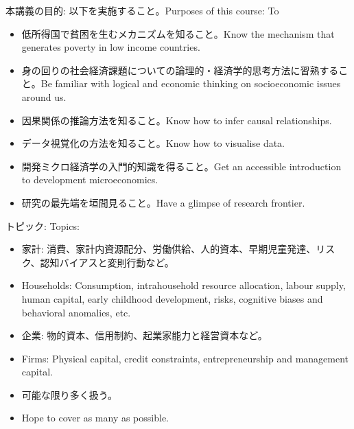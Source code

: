 \begin{frame}{}
本講義の目的: 以下を実施すること。Purposes of this course: To
\begin{itemize}[<+->]
\vspace{1.0ex}\setlength{\itemsep}{3.0ex}\setlength{\baselineskip}{12pt}
\item	低所得国で貧困を生むメカニズムを知ること。Know the mechanism that generates poverty in low income countries.
\item	身の回りの社会経済課題についての論理的・経済学的思考方法に習熟すること。Be familiar with logical and economic thinking on socioeconomic issues around us.
\item	因果関係の推論方法を知ること。Know how to infer causal relationships.
\item	データ視覚化の方法を知ること。Know how to visualise data.
\item	開発ミクロ経済学の入門的知識を得ること。Get an accessible introduction to development microeconomics.
\item	研究の最先端を垣間見ること。Have a glimpse of research frontier.
\end{itemize}
\end{frame}


\begin{frame}{}
トピック: Topics: 
\begin{itemize}[<+->]
\vspace{1.0ex}\setlength{\itemsep}{1.0ex}\setlength{\baselineskip}{12pt}
\item	家計: 消費、家計内資源配分、労働供給、人的資本、早期児童発達、リスク、認知バイアスと変則行動など。
\item	Households: Consumption, intrahousehold resource allocation, labour supply, human capital, early childhood development, risks, cognitive biases and behavioral anomalies, etc.
\item	企業: 物的資本、信用制約、起業家能力と経営資本など。
\item	Firms: Physical capital, credit constraints, entrepreneurship and management capital.
\item	可能な限り多く扱う。
\item	Hope to cover as many as possible.
\end{itemize}
\end{frame}


